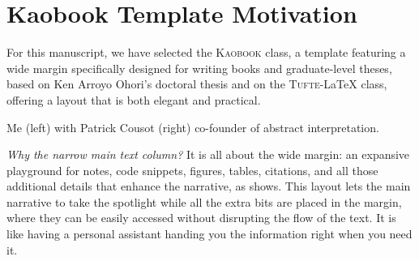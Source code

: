 \def\customcitkey{Urban2018}\def\absintkey{Cousot1977}


\chapter*{Kaobook Template Motivation}

For this manuscript, we have selected the \textsc{Kaobook} class, a template featuring a wide margin specifically designed for writing books and graduate-level theses, based on Ken Arroyo Ohori's doctoral thesis and on the \textsc{Tufte}-\LaTeX{} class, offering a layout that is both elegant and practical.

\marginnote{\formatmargincitation{\absintkey}}
\newcommand*{\ClipSep}{0.5cm}
\begin{marginfigure}
  \centering
  \hspace*{-\ClipSep}
    \vspace*{-\ClipSep}
  \caption{Me (left) with Patrick Cousot (right) co-founder of abstract interpretation\cite{\absintkey}.}
\end{marginfigure}

\emph{Why the narrow main text column?} It is all about the wide margin: an expansive playground for notes, code snippets, figures, tables, citations, and all those additional details that enhance the narrative, as  shows.
This layout lets the main narrative to take the spotlight while all the extra bits are placed in the margin, where they can be easily accessed without disrupting the flow of the text. It is like having a personal assistant handing you the information right when you need it.

